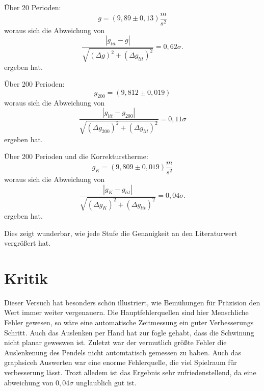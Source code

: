 Über 20 Perioden:
\begin{equation}
\boxed{
    g  = ( 9,89 \pm 0,13) \frac{m}{s^2}
}
\end{equation}
woraus sich die Abweichung von 
\begin{equation}
    \frac{\left| g_{lit} - g \right|}{\sqrt{(\Delta g)^2 + (\Delta g_{lit})^2}} = 0,62\sigma.
\end{equation}
ergeben hat.


Über 200 Perioden:
\begin{equation}
    \boxed{
        g_{200} = (9,812 \pm 0,019)
    }
\end{equation}
woraus sich die Abweichung von 
\begin{equation}
    \frac{\left| g_{lit} - g_{200} \right|}{\sqrt{(\Delta g_{200})^2 + (\Delta g_{lit})^2}} = 0,11\sigma
\end{equation}
ergeben hat.


Über 200 Perioden und die Korrekturstherme:
\begin{equation}
    \boxed{
        g_K = (9,809 \pm 0,019) \frac{m}{s^2}
    }
\end{equation}
woraus sich die Abweichung von 
\begin{equation}
    \frac{\left| g_K - g_{lit} \right|}{\sqrt{(\Delta g_K)^2 + (\Delta g_{lit})^2}} = 0,04\sigma.
\end{equation}
ergeben hat.

Dies zeigt wunderbar, wie jede Stufe die Genauigkeit an den Literaturwert vergrößert hat. 

\section{Kritik}
Dieser Versuch hat besonders schön illustriert, wie Bemühungen für Präzision den Wert immer weiter vergenauern. Die Hauptfehlerquellen sind hier Menschliche Fehler gewesen, so wäre eine automatische Zeitmessung ein guter Verbesserungs Schritt. Auch das Auslenken per Hand hat zur fogle gehabt, dass die Schwinung nicht planar geweswen ist. Zuletzt war der vermutlich größte Fehler die Auslenkenung des Pendels nicht automtatisch gemessen zu haben.
Auch das graphsiceh Auswerten war eine enorme Fehlerquelle, die viel Spielraum für verbesserung lässt. Trozt alledem ist das Ergebnis sehr zufriedenstellend, da eine abweichung von $0,04\sigma$ unglaublich gut ist.